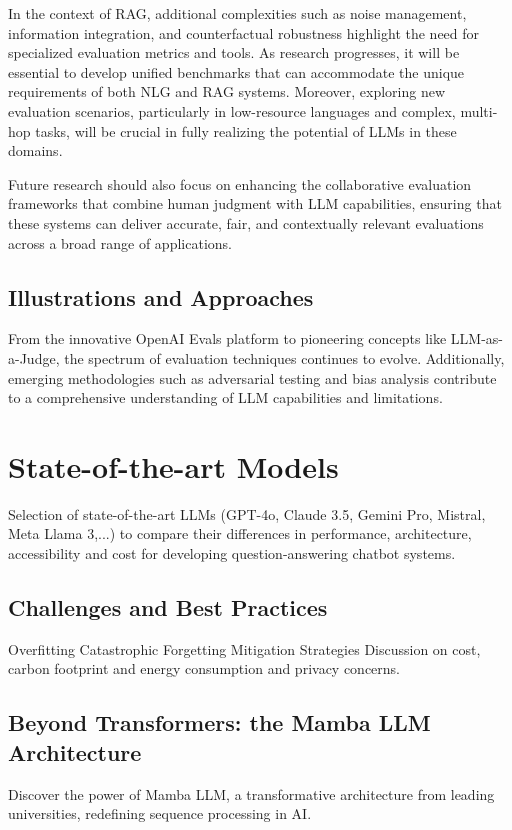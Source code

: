 In the context of RAG, additional complexities such as noise management, information integration, and counterfactual robustness highlight the need for specialized evaluation metrics and tools. As research progresses, it will be essential to develop unified benchmarks that can accommodate the unique requirements of both NLG and RAG systems. Moreover, exploring new evaluation scenarios, particularly in low-resource languages and complex, multi-hop tasks, will be crucial in fully realizing the potential of LLMs in these domains.

Future research should also focus on enhancing the collaborative evaluation frameworks that combine human judgment with LLM capabilities, ensuring that these systems can deliver accurate, fair, and contextually relevant evaluations across a broad range of applications.

\subsection{Illustrations and Approaches}

From the innovative OpenAI Evals platform to pioneering concepts like LLM-as-a-Judge, the spectrum of evaluation techniques continues to evolve. Additionally, emerging methodologies such as adversarial testing and bias analysis contribute to a comprehensive understanding of LLM capabilities and limitations.


\newpage

\section{State-of-the-art Models}
Selection of state-of-the-art LLMs (GPT-4o, Claude 3.5, Gemini Pro, Mistral, Meta Llama 3,...) to compare their differences in performance, architecture, accessibility and cost for developing question-answering chatbot systems.

\subsection{Challenges and Best Practices}
Overfitting
Catastrophic Forgetting
Mitigation Strategies
Discussion on cost, carbon footprint and energy consumption and privacy concerns.

\subsection{Beyond Transformers: the Mamba LLM Architecture}
Discover the power of Mamba LLM, a transformative architecture from leading universities, redefining sequence processing in AI.

